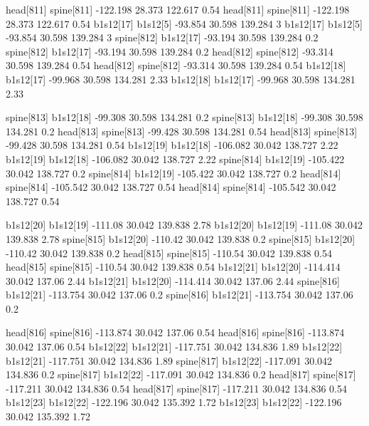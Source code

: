 head[811]    spine[811]    -122.198    28.373    122.617    0.54
head[811]    spine[811]    -122.198    28.373    122.617    0.54
b1s12[17]    b1s12[5]    -93.854    30.598    139.284    3
b1s12[17]    b1s12[5]    -93.854    30.598    139.284    3
spine[812]    b1s12[17]    -93.194    30.598    139.284    0.2
spine[812]    b1s12[17]    -93.194    30.598    139.284    0.2
head[812]    spine[812]    -93.314    30.598    139.284    0.54
head[812]    spine[812]    -93.314    30.598    139.284    0.54
b1s12[18]    b1s12[17]    -99.968    30.598    134.281    2.33
b1s12[18]    b1s12[17]    -99.968    30.598    134.281    2.33


spine[813]    b1s12[18]    -99.308    30.598    134.281    0.2
spine[813]    b1s12[18]    -99.308    30.598    134.281    0.2
head[813]    spine[813]    -99.428    30.598    134.281    0.54
head[813]    spine[813]    -99.428    30.598    134.281    0.54
b1s12[19]    b1s12[18]    -106.082    30.042    138.727    2.22
b1s12[19]    b1s12[18]    -106.082    30.042    138.727    2.22
spine[814]    b1s12[19]    -105.422    30.042    138.727    0.2
spine[814]    b1s12[19]    -105.422    30.042    138.727    0.2
head[814]    spine[814]    -105.542    30.042    138.727    0.54
head[814]    spine[814]    -105.542    30.042    138.727    0.54


b1s12[20]    b1s12[19]    -111.08    30.042    139.838    2.78
b1s12[20]    b1s12[19]    -111.08    30.042    139.838    2.78
spine[815]    b1s12[20]    -110.42    30.042    139.838    0.2
spine[815]    b1s12[20]    -110.42    30.042    139.838    0.2
head[815]    spine[815]    -110.54    30.042    139.838    0.54
head[815]    spine[815]    -110.54    30.042    139.838    0.54
b1s12[21]    b1s12[20]    -114.414    30.042    137.06    2.44
b1s12[21]    b1s12[20]    -114.414    30.042    137.06    2.44
spine[816]    b1s12[21]    -113.754    30.042    137.06    0.2
spine[816]    b1s12[21]    -113.754    30.042    137.06    0.2


head[816]    spine[816]    -113.874    30.042    137.06    0.54
head[816]    spine[816]    -113.874    30.042    137.06    0.54
b1s12[22]    b1s12[21]    -117.751    30.042    134.836    1.89
b1s12[22]    b1s12[21]    -117.751    30.042    134.836    1.89
spine[817]    b1s12[22]    -117.091    30.042    134.836    0.2
spine[817]    b1s12[22]    -117.091    30.042    134.836    0.2
head[817]    spine[817]    -117.211    30.042    134.836    0.54
head[817]    spine[817]    -117.211    30.042    134.836    0.54
b1s12[23]    b1s12[22]    -122.196    30.042    135.392    1.72
b1s12[23]    b1s12[22]    -122.196    30.042    135.392    1.72


